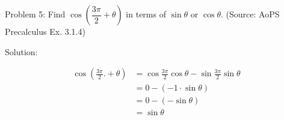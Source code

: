 Problem 5: Find $\cos\left(\dfrac{3\pi}{2} + \theta\right)$ in terms of $\sin \theta$ or $\cos \theta$. (Source: AoPS Precalculus Ex. 3.1.4)

Solution:

\begin{align*}
\cos(\frac{3\pi}{2}. + \theta) &= \cos \frac{3\pi}{2} \cos \theta - \sin \frac{3\pi}{2} \sin \theta \\
&= 0 - (-1 \cdot \sin \theta) \\
&= 0 - (- \sin \theta) \\
&= \boxed{\sin \theta}
\end{align*}
